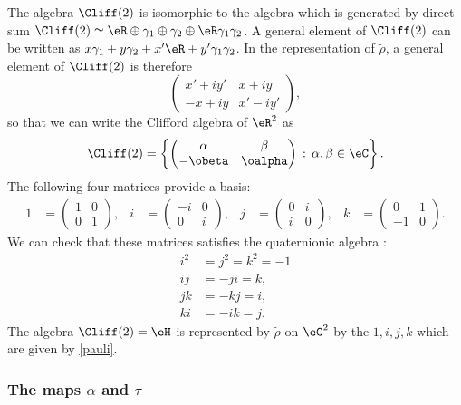 The algebra $\Cliff(2)$ is isomorphic to the algebra which is generated by direct sum $\Cliff(2)\simeq\eR\oplus\gamma_1\oplus\gamma_2\oplus\eR\gamma_1\gamma_2$. A general element of $\Cliff(2)$ can be written as $x\gamma_1+y\gamma_2+x'\eR+y'\gamma_1\gamma_2$. In the representation of $\tilde\rho$, a general element of $\Cliff(2)$ is therefore
\[\begin{pmatrix}
x'+iy' & x+iy \\
-x+iy & x'-iy'
\end{pmatrix},\] so that we can write the Clifford algebra of $\eR^2$ as
\[
\Cliff(2)=\left\{\begin{pmatrix}
 \alpha & \beta \\
 -\obeta & \oalpha
 \end{pmatrix}\,:\,\alpha,\beta\in\eC\right\}.
\]
The following four matrices provide a basis:
\begin{align}\label{pauli} 
1&=\begin{pmatrix}
1 & 0 \\
0 & 1
\end{pmatrix}, &i&=\begin{pmatrix}
-i & 0 \\
0 & i
\end{pmatrix},&j&=\begin{pmatrix}
0 & i \\
i & 0
\end{pmatrix},&k&=\begin{pmatrix}
0 & 1 \\
-1 & 0
\end{pmatrix}.
\end{align}
We can check that these matrices satisfies the quaternionic algebra :
\begin{equation}
\begin{split}
i^2&=j^2=k^2=-1\\
ij &=-ji=k,\\
jk &=-kj=i,\\
ki &=-ik=j.
\end{split}
\end{equation}
The algebra $\Cliff(2)=\eH$ is represented by $\tilde\rho$ on $\eC^2$ by the  $1,i,j,k$ which are given by \eqref{pauli}.

\subsubsection{The maps \texorpdfstring{$\alpha$}{a} and \texorpdfstring{$\tau$}{t}}

